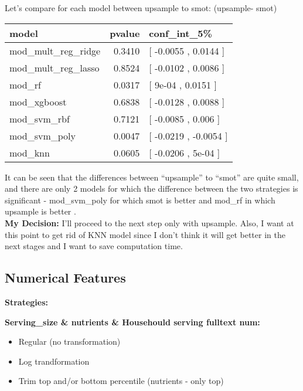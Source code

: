 \documentclass[
]{article}
\providecommand{\tightlist}{%
  \setlength{\itemsep}{0pt}\setlength{\parskip}{0pt}}
\begin{document}
Let's compare for each model between upsample to smot: (upsample- smot)

\begin{table}[H]
\centering\begingroup\fontsize{8}{10}\selectfont

\begin{tabular}{lrl}
\toprule
model & pvalue & conf\_int\_5\%\\
\midrule
\rowcolor{gray!6}  mod\_mult\_reg\_ridge & 0.3410 & [ -0.0055 , 0.0144 ]\\
mod\_mult\_reg\_lasso & 0.8524 & [ -0.0102 , 0.0086 ]\\
\rowcolor{gray!6}  mod\_rf & 0.0317 & [ 9e-04 , 0.0151 ]\\
mod\_xgboost & 0.6838 & [ -0.0128 , 0.0088 ]\\
\rowcolor{gray!6}  mod\_svm\_rbf & 0.7121 & [ -0.0085 , 0.006 ]\\
\addlinespace
mod\_svm\_poly & 0.0047 & [ -0.0219 , -0.0054 ]\\
\rowcolor{gray!6}  mod\_knn & 0.0605 & [ -0.0206 , 5e-04 ]\\
\bottomrule
\end{tabular}
\endgroup{}
\end{table}

It can be seen that the differences between ``upsample'' to ``smot'' are
quite small, and there are only 2 models for which the difference
between the two strategies is significant - mod\_svm\_poly for which
smot is better and mod\_rf in which upsample is better .\\
\textbf{My Decision:} I'll proceed to the next step only with upsample.
Also, I want at this point to get rid of KNN model since I don't think
it will get better in the next stages and I want to save computation
time.

\hypertarget{numerical-features}{%
\subsection{Numerical Features}\label{numerical-features}}

\textbf{Strategies:}

\textbf{Serving\_size \& nutrients \& Househould serving fulltext num:}

\begin{itemize}
\tightlist
\item
  Regular (no transformation)
\item
  Log trandformation
\item
  Trim top and/or bottom percentile (nutrients - only top)
\end{itemize}
\end{document}
